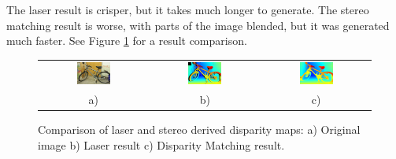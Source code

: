 \documentclass[11pt,fleqn]{article}
\begin{document}
\newpage
The laser result is crisper, but it takes much longer to generate. The stereo matching result is worse, with parts of the image blended, but it was generated much faster. See Figure \ref{fig:result1} for a result comparison.

\begin{figure}[!h]
\begin{mdframed}
\centering
\setlength{}
\begin{tabular}{ccc}
\includegraphics[width=0.33\textwidth]{images/_im0-600.jpg} &
\includegraphics[width=0.33\textwidth]{images/disp0GT-600.jpg} &
\includegraphics[width=0.33\textwidth]{images/_disp-600.jpg} \\[2pt]
a) & b) & c) \\
\end{tabular}
\caption[Comparison of laser and stereo derived disparity maps]{Comparison of laser and stereo derived disparity maps: a) Original image b) Laser result c) Disparity Matching result.}
\label{fig:result1}
\end{mdframed}
\end{figure}
\end{document}
